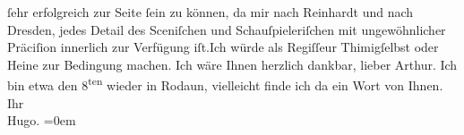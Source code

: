 \begin{ledgroupsized}[t]{13cm}
               ſehr erfolgreich zur Seite ſein zu können, da mir nach Reinhardt und nach Dresden, jedes Detail
               des Sceniſchen und Schauſpieleriſchen mit ungewöhnlicher Präciſion innerlich zur
               Verfügung iſt.\hspace*{1.5em}Ich würde als Regiſſeur Thimigſelbst oder Heine zur Bedingung machen.\pend
           \pstart
           Ich wäre Ihnen herzlich dankbar, lieber Arthur. Ich bin etwa den 8\textsuperscript{ten} wieder in Rodaun, vielleicht finde ich da
               ein Wort von Ihnen.\pend
           \pstart
           Ihr{\\[\baselineskip]}\spacefill\mbox{Hugo.}\pend
           \leftskip=0em{}
         
         \endnumbering{}\end{ledgroupsized}  \newcommand{\dateiname}{L02112}\newcommand{\titel}{Hugo von Hofmannsthal an Arthur Schnitzler, 3. 1. 1913}\newcommand{\editorInnen}{Martin Anton Müller und Gerd-Hermann Susen}
      